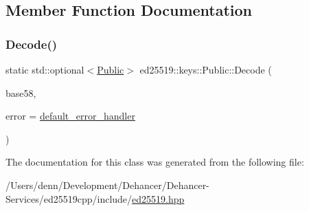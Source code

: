 \subsection{Member Function Documentation}
\mbox{\label{classed25519_1_1keys_1_1_public_af8a468caa9cc98160b65ec072f949e97}} 
\subsubsection{\texorpdfstring{Decode()}{Decode()}}
{\footnotesize\ttfamily static std\+::optional$<$\mbox{\hyperlink{classed25519_1_1keys_1_1_public}{Public}}$>$ ed25519\+::keys\+::\+Public\+::\+Decode (\begin{DoxyParamCaption}\item[{const std\+::string \&}]{base58,  }\item[{const \mbox{\hyperlink{namespaceed25519_a6ba572942b3c18591fc869d52a6b16e6}{Error\+Handler}} \&}]{error = {\ttfamily \mbox{\hyperlink{namespaceed25519_a7c7bb6ed17541162959c33ed3e3b15fb}{default\+\_\+error\+\_\+handler}}} }\end{DoxyParamCaption})\hspace{0.3cm}{\ttfamily [static]}}



The documentation for this class was generated from the following file\+:\begin{DoxyCompactItemize}
\item 
/\+Users/denn/\+Development/\+Dehancer/\+Dehancer-\/\+Services/ed25519cpp/include/\mbox{\hyperlink{ed25519_8hpp}{ed25519.\+hpp}}\end{DoxyCompactItemize}
